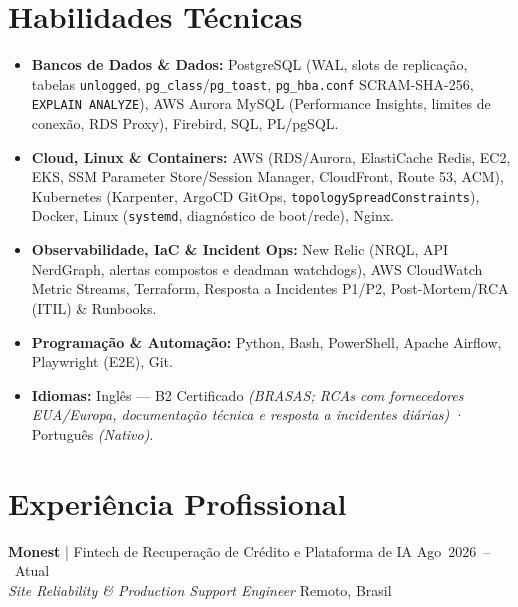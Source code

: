 \documentclass[10pt,a4paper]{article}
\begin{document}
\section{Habilidades Técnicas}
\begin{itemize}
    \item \textbf{Bancos de Dados \& Dados:} PostgreSQL (WAL, slots de replicação, tabelas \texttt{unlogged}, \texttt{pg\_class}/\texttt{pg\_toast}, \mbox{\texttt{pg\_hba.conf}} \mbox{SCRAM-SHA-256}, \mbox{\texttt{EXPLAIN ANALYZE}}), AWS Aurora MySQL (Performance Insights, limites de conexão, RDS Proxy), Firebird, SQL, PL/pgSQL.
    \item \textbf{Cloud, Linux \& Containers:} AWS (RDS/Aurora, ElastiCache Redis, EC2, EKS, SSM Parameter Store/Session Manager, CloudFront, Route 53, ACM), Kubernetes (Karpenter, ArgoCD GitOps, \mbox{\texttt{topologySpreadConstraints}}), Docker, Linux (\texttt{systemd}, diagnóstico de boot/rede), Nginx.
    \item \textbf{Observabilidade, IaC \& Incident Ops:} New Relic (NRQL, API NerdGraph, alertas compostos e deadman watchdogs), AWS CloudWatch Metric Streams, Terraform, Resposta a Incidentes \mbox{P1/P2}, \mbox{Post-Mortem/RCA} (ITIL) \& Runbooks.
    \item \textbf{Programação \& Automação:} Python, Bash, PowerShell, Apache Airflow, Playwright (E2E), Git.
    \item \textbf{Idiomas:} Inglês --- B2 Certificado \textit{(BRASAS; RCAs com fornecedores EUA/Europa, documentação técnica e resposta a incidentes diárias)} · Português \textit{(Nativo)}.
\end{itemize}

\section{Experiência Profissional}

\textbf{Monest} | Fintech de Recuperação de Crédito e Plataforma de IA \hfill \mbox{Ago 2026 -- Atual} \\
\textit{Site Reliability \& Production Support Engineer} \hfill Remoto, Brasil
\end{document}
